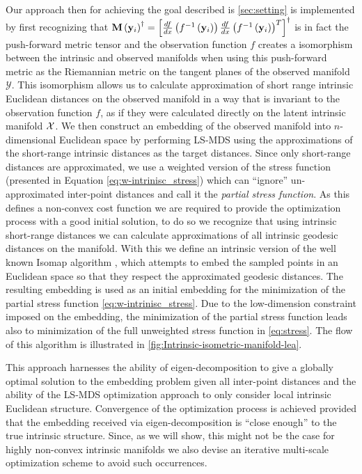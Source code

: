 	Our approach then for achieving the goal described is \cref{sec:setting} is implemented by first recognizing that $\mathbf{M}\left({\bf y}_{i}\right)^{\dagger}=\left[\frac{df}{dx}\left(f^{-1}\left({\bf y}_{i}\right)\right)\frac{df}{dx}\left(f^{-1}\left({\bf y}_{i}\right)\right)^{T}\right]^{\dagger}$ is in fact the push-forward metric tensor and the observation function $f$ creates a isomorphism between the intrinsic and observed manifolds when using this push-forward metric as the Riemannian metric on the tangent planes of the observed manifold $\mathcal{Y}$. This isomorphism allows us to calculate approximation of short range intrinsic Euclidean distances on the observed manifold in a way that is invariant to the observation function $f$, as if they were calculated directly on the latent intrinsic manifold $\text{\ensuremath{\mathcal{X}}}$. We then construct an embedding of the observed manifold into $n$-dimensional Euclidean space by performing \ac{LS-MDS} using the approximations of the short-range intrinsic distances as the target distances. Since only short-range distances are approximated, we use a weighted version of the stress function (presented in Equation \cref{eq:w-intrinisc_stress}) which can ``ignore'' un-approximated inter-point distances and call it the \textit{partial stress function}. As this defines a non-convex cost function we are required to provide the optimization process with a good initial solution, to do so we recognize that using intrinsic short-range distances we can calculate approximations of all intrinsic geodesic distances on the manifold. With this we define an intrinsic version of the well known Isomap algorithm \cite{tenenbaum2000global}, which attempts to embed the sampled points in an Euclidean space so that they respect the approximated geodesic distances. The resulting embedding is used as an initial embedding for the minimization of the partial stress function \cref{eq:w-intrinisc_stress}. Due to the low-dimension constraint imposed on the embedding, the minimization of the partial stress function leads also to minimization of the full unweighted stress function in \cref{eq:stress}. The flow of this algorithm is illustrated in \cref{fig:Intrinsic-isometric-manifold-lea}.
	
	This approach harnesses the ability of eigen-decomposition to give a globally optimal solution to the embedding problem given all inter-point distances and the ability of the \ac{LS-MDS} optimization approach to only consider local intrinsic Euclidean structure. Convergence of the optimization process is achieved provided that the embedding received via eigen-decomposition is ``close enough'' to the true intrinsic structure. Since, as we will show, this might not be the case for highly non-convex intrinsic manifolds we also devise an iterative multi-scale optimization scheme to avoid such occurrences. 
	
